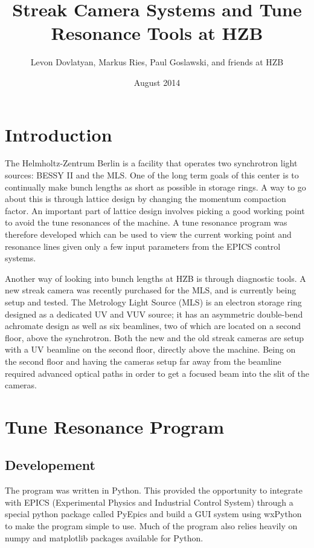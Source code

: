 \documentclass[%
 reprint,%
 amssymb, amsmath,%
 aip,cha,%
]{revtex4-1}
\begin{document}
\title{Streak Camera Systems and Tune Resonance Tools at HZB}%

\author{Levon Dovlatyan, Markus Ries, Paul Goslawski, and friends at HZB}%
%

\date{August 2014}%

\maketitle

\tableofcontents

\section{Introduction}

The Helmholtz-Zentrum Berlin is a facility that operates two synchrotron light sources: BESSY II and the MLS. One of the long term goals of this center is to continually make bunch lengths as short as possible in storage rings. A way to go about this is through lattice design by changing the momentum compaction factor. An important part of lattice design involves picking a good working point to avoid the tune resonances of the machine. A tune resonance program was therefore developed which can be used to view the current working point and resonance lines given only a few input parameters from the EPICS control systems.

Another way of looking into bunch lengths at HZB is through diagnostic tools. A new streak camera was recently purchased for the MLS, and is currently being setup and tested. The Metrology Light Source (MLS) is an electron storage ring designed as a dedicated UV and VUV source; it has an asymmetric double-bend achromate design as well as six beamlines, two of which are located on a second floor, above the synchrotron. Both the new and the old streak cameras are setup with a UV beamline on the second floor, directly above the machine. Being on the second floor and having the cameras setup far away from the beamline required advanced optical paths in order to get a focused beam into the slit of the cameras.

\section{Tune Resonance Program}

\subsection{Developement}
The program was written in Python. This provided the opportunity to integrate with EPICS (Experimental Physics and Industrial Control System) through a special python package called PyEpics and build a GUI system using wxPython to make the program simple to use. Much of the program also relies heavily on numpy and matplotlib packages available for Python.
\end{document}
